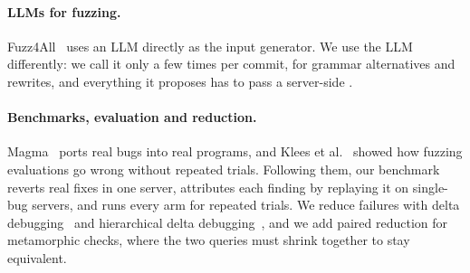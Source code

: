 \paragraph{LLMs for fuzzing.} Fuzz4All~\cite{xia2024fuzz4all} uses an LLM
directly as the input generator. We use the LLM differently: we call it only a
few times per commit, for grammar alternatives and rewrites, and everything it
proposes has to pass a server-side \gate.

\paragraph{Benchmarks, evaluation and reduction.} Magma~\cite{hazimeh2020magma}
ports real bugs into real programs, and Klees et al.~\cite{klees2018evaluating}
showed how fuzzing evaluations go wrong without repeated trials. Following
them, our benchmark reverts real fixes in one server, attributes each finding by
replaying it on single-bug servers, and runs every arm for repeated trials. We
reduce failures with delta debugging~\cite{zeller2002dd} and hierarchical delta
debugging~\cite{misherghi2006hdd}, and we add paired reduction for metamorphic
checks, where the two queries must shrink together to stay equivalent.
